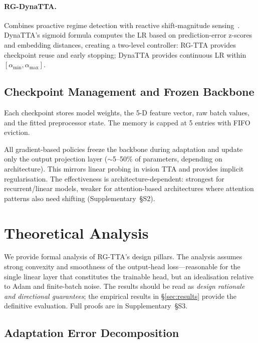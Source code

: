 \documentclass[journal]{IEEEtran}
\begin{document}
\paragraph{RG-DynaTTA.} Combines proactive regime detection with reactive shift-magnitude sensing~\cite{grover2025dynatta}. DynaTTA's sigmoid formula computes the LR based on prediction-error z-scores and embedding distances, creating a two-level controller: RG-TTA provides checkpoint reuse and early stopping; DynaTTA provides continuous LR within $[\alpha_{\min}, \alpha_{\max}]$.

\subsection{Checkpoint Management and Frozen Backbone}
\label{sec:checkpoints}

Each checkpoint stores model weights, the 5-D feature vector, raw batch values, and the fitted preprocessor state. The memory is capped at 5 entries with FIFO eviction.

All gradient-based policies freeze the backbone during adaptation and update only the output projection layer ($\sim$5--50\% of parameters, depending on architecture). This mirrors linear probing in vision TTA and provides implicit regularisation. The effectiveness is architecture-dependent: strongest for recurrent/linear models, weaker for attention-based architectures where attention patterns also need shifting (Supplementary~\S{S2}).


\section{Theoretical Analysis}
\label{sec:theory}

We provide formal analysis of RG-TTA's design pillars. The analysis assumes strong convexity and smoothness of the output-head loss---reasonable for the single linear layer that constitutes the trainable head, but an idealisation relative to Adam and finite-batch noise. The results should be read as \emph{design rationale and directional guarantees}; the empirical results in \S\ref{sec:results} provide the definitive evaluation. Full proofs are in Supplementary~\S{S3}.

\subsection{Adaptation Error Decomposition}
\end{document}
